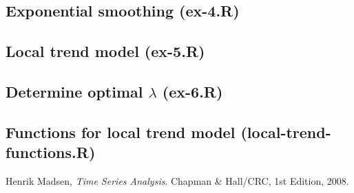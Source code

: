 \documentclass[11pt]{article}
\begin{document}
\subsection*{Exponential smoothing (ex-4.R)}

\subsection*{Local trend model (ex-5.R)}

\subsection*{Determine optimal $\lambda$ (ex-6.R)}

\subsection*{Functions for local trend model (local-trend-functions.R)}



\pagebreak

\begin{thebibliography}{9}

  Henrik Madsen,
  \emph{Time Series Analysis}.
  Chapman \& Hall/CRC,
  1st Edition,
  2008.

\end{thebibliography}
\end{document}
